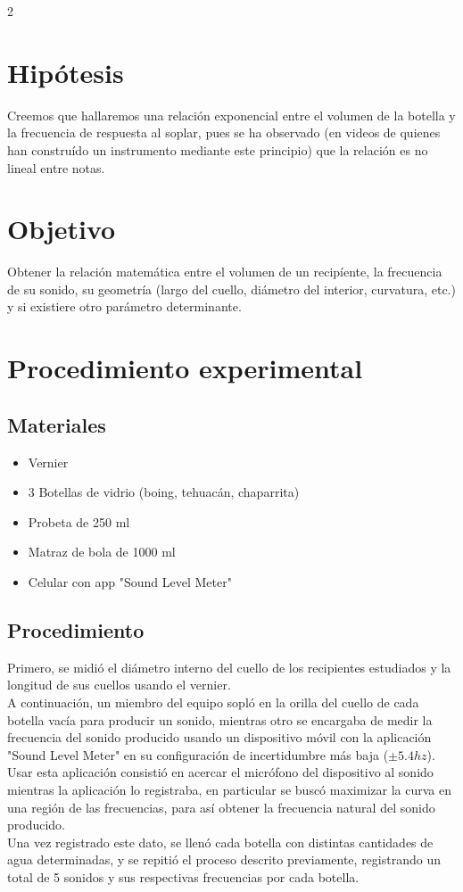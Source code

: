 \documentclass[article,12pt]{elsarticle}
\begin{document}
\begin{multicols}{2}
        
        
        
\section{Hipótesis}
Creemos que hallaremos una relación exponencial entre el volumen de la botella y la frecuencia de respuesta al soplar, pues se ha observado (en videos de quienes han construído un instrumento mediante este principio) que la relación es no lineal entre notas.


\section{Objetivo}
Obtener la relación matemática entre el volumen de un recipíente, la frecuencia de su sonido, su geometría (largo del cuello, diámetro del interior, curvatura, etc.) y si existiere otro parámetro determinante.


    \section{Procedimiento experimental}
        \subsection{Materiales}
            \begin{itemize}
                \item Vernier
                \item 3 Botellas de vidrio (boing, tehuacán, chaparrita)
                \item Probeta de 250 ml
                \item Matraz de bola de 1000 ml
                \item Celular con app "Sound Level Meter"
            \end{itemize}
        \subsection{Procedimiento}
        Primero, se midió el diámetro interno del cuello de los recipientes estudiados y la longitud de sus cuellos usando el vernier. \\
        A continuación, un miembro del equipo sopló en la orilla del cuello de cada botella vacía para producir un sonido, mientras otro se encargaba de medir la frecuencia del sonido producido usando un dispositivo móvil con la aplicación "Sound Level Meter" en su configuración de incertidumbre más baja (\(\pm 5.4hz\)). Usar esta aplicación consistió en acercar el micrófono del dispositivo al sonido mientras la aplicación lo registraba, en particular se buscó maximizar la curva en una región de las frecuencias, para así obtener la frecuencia natural del sonido producido.\\
        Una vez registrado este dato, se llenó cada botella con distintas cantidades de agua determinadas, y se repitió el proceso descrito previamente, registrando un total de 5 sonidos y sus respectivas frecuencias por cada botella.

    \end{multicols}
\end{document}
